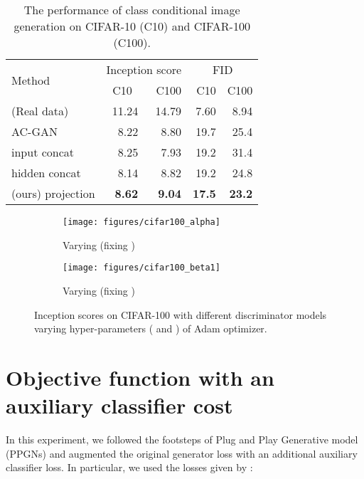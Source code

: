\documentclass{article}
\begin{document}
\begin{table}[htp]
\caption{\label{tab:inception_scores_cifar}The performance of class conditional image generation on CIFAR-10 (C10) and CIFAR-100 (C100).}
\centering
\begin{tabular}[t]{lrrrr}
\toprule
\multirow{2}{*}{Method} & \multicolumn{2}{c}{Inception score} & \multicolumn{2}{c}{FID} \\
& \multicolumn{1}{c}{C10} & C100 & C10 & C100 \\
\midrule
(Real data) & 11.24 & 14.79 &  7.60 & 8.94\\
\midrule
AC-GAN & 8.22 & 8.80 & 19.7 & 25.4\\
input concat & 8.25 & 7.93 & 19.2 & 31.4\\
hidden concat & 8.14 & 8.82 & 19.2 & 24.8\\
(ours) projection & \bf{8.62} & \textbf{9.04} & \textbf{17.5} & \textbf{23.2}\\
\bottomrule
\end{tabular}
\end{table}

\begin{figure}[ht]
    \centering
    \begin{subfigure}{0.4\textwidth}
    \texttt{[image: figures/cifar100\_alpha]}
        \caption{\label{fig:cifar100_alpha}Varying  (fixing ) }
    \end{subfigure}
    \begin{subfigure}{0.4\textwidth}
        \texttt{[image: figures/cifar100\_beta1]}
        \caption{\label{fig:cifar100_beta1}Varying  (fixing ) }
    \end{subfigure}
    \caption{\label{fig:cifar100_hyperparameters} Inception scores on CIFAR-100 with different discriminator models varying hyper-parameters ( and ) of Adam optimizer.}
\end{figure}

\section{\label{apdsec:aux} Objective function with an auxiliary classifier cost}
In this experiment,  we followed  the footsteps of Plug and Play Generative model (PPGNs) \cite[]{nguyen2017plug} and augmented the original generator loss with an additional auxiliary classifier loss. In particular, we used the losses given by :
\end{document}
